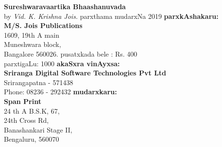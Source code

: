 \thispagestyle{empty}
\begin{flushleft}
{\rm{\textbf{Sureshwaravaartika Bhaashanuvada}\\by \textit{Vid. K. Krishna Jois.}}}
\vfill
parxthama mudarxNa {\rm {2019}}
\vfill
\textbf{parxkAshakaru:}\\
{\rm {\textbf{M/S. Jois Publications} \\
1609, 19th A main\\
Muneshwara block,\\
Bangalore 560026.}}
\vfill
pusatxkada bele : {\rm {Rs. 400}}\\
parxtigaLu: {\rm {1000}}
\vfill
\textbf{akaSxra vinAyxsa:}\\ {\rm{\textbf{Sriranga Digital Software Technologies Pvt Ltd}\\ Srirangapatna - 571438\\ Phone: 08236 - 292432}}
\vfill
\textbf{mudarxkaru:}\\ {\rm{\textbf{Span Print}\\ 24 th A B.S.K, 67,\\ 24th Cross Rd,\\ Banashankari Stage II,\\ Bengaluru, 560070}}

\end{flushleft}
